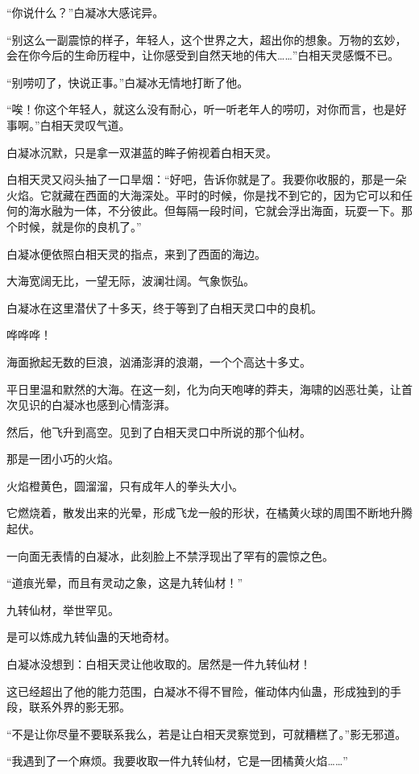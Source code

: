 \begin{this_body}
“你说什么？”白凝冰大感诧异。

“别这么一副震惊的样子，年轻人，这个世界之大，超出你的想象。万物的玄妙，会在你今后的生命历程中，让你感受到自然天地的伟大……”白相天灵感慨不已。

“别唠叨了，快说正事。”白凝冰无情地打断了他。

“唉！你这个年轻人，就这么没有耐心，听一听老年人的唠叨，对你而言，也是好事啊。”白相天灵叹气道。

白凝冰沉默，只是拿一双湛蓝的眸子俯视着白相天灵。

白相天灵又闷头抽了一口旱烟：“好吧，告诉你就是了。我要你收服的，那是一朵火焰。它就藏在西面的大海深处。平时的时候，你是找不到它的，因为它可以和任何的海水融为一体，不分彼此。但每隔一段时间，它就会浮出海面，玩耍一下。那个时候，就是你的良机了。”

白凝冰便依照白相天灵的指点，来到了西面的海边。

大海宽阔无比，一望无际，波澜壮阔。气象恢弘。

白凝冰在这里潜伏了十多天，终于等到了白相天灵口中的良机。

哗哗哗！

海面掀起无数的巨浪，汹涌澎湃的浪潮，一个个高达十多丈。

平日里温和默然的大海。在这一刻，化为向天咆哮的莽夫，海啸的凶恶壮美，让首次见识的白凝冰也感到心情澎湃。

然后，他飞升到高空。见到了白相天灵口中所说的那个仙材。

那是一团小巧的火焰。

火焰橙黄色，圆溜溜，只有成年人的拳头大小。

它燃烧着，散发出来的光晕，形成飞龙一般的形状，在橘黄火球的周围不断地升腾起伏。

一向面无表情的白凝冰，此刻脸上不禁浮现出了罕有的震惊之色。

“道痕光晕，而且有灵动之象，这是九转仙材！”

九转仙材，举世罕见。

是可以炼成九转仙蛊的天地奇材。

白凝冰没想到：白相天灵让他收取的。居然是一件九转仙材！

这已经超出了他的能力范围，白凝冰不得不冒险，催动体内仙蛊，形成独到的手段，联系外界的影无邪。

“不是让你尽量不要联系我么，若是让白相天灵察觉到，可就糟糕了。”影无邪道。

“我遇到了一个麻烦。我要收取一件九转仙材，它是一团橘黄火焰……”


\end{this_body}
